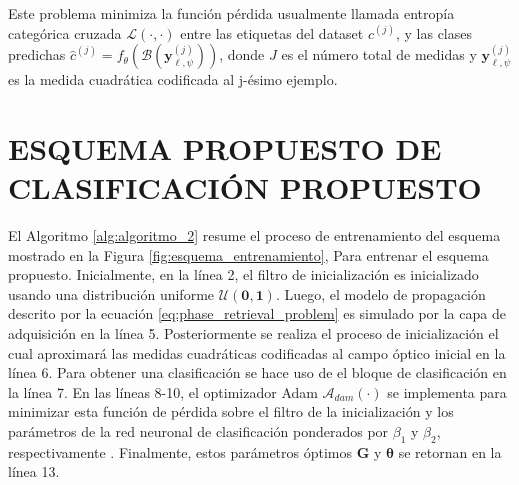 Este problema minimiza la función pérdida usualmente llamada entropía categórica cruzada $\mathcal{L}(\cdot, \cdot)$ entre las etiquetas del dataset $c^{(j)}$, y las clases predichas $\hat{c}^{(j)} = f_\theta(\mathcal{B}(\mathbf{y}_{\ell, \psi}^{(j)}))$, donde $J$ es el número total de medidas y $\mathbf{y}_{\ell, \psi}^{(j)}$ es la medida cuadrática codificada al  j-ésimo ejemplo.


\section{ESQUEMA PROPUESTO DE CLASIFICACIÓN PROPUESTO}

El Algoritmo \ref{alg:algoritmo_2} resume el proceso de entrenamiento del esquema mostrado en la Figura \ref{fig:esquema_entrenamiento},  Para entrenar el esquema propuesto. Inicialmente, en la línea 2, el filtro de inicialización es inicializado usando una distribución uniforme $\mathcal{U}(\mathbf{0},\mathbf{1})$. Luego, el modelo de propagación descrito por la ecuación \eqref{eq:phase_retrieval_problem} es simulado por la capa de adquisición en la línea 5. Posteriormente se realiza el proceso de inicialización el cual aproximará las medidas cuadráticas codificadas al campo óptico inicial en la línea 6. Para obtener una clasificación se hace uso de el bloque de clasificación en la línea 7. En las líneas 8-10, el optimizador Adam $\mathcal{A}_{dam}(\cdot)$ se implementa para minimizar esta función de pérdida sobre el filtro de la inicialización y los parámetros de la red neuronal de clasificación ponderados por $\beta_1$ y $\beta_2$, respectivamente . Finalmente, estos parámetros óptimos $\mathbf{G}$ y $\boldsymbol{\theta}$ se retornan en la línea 13.



